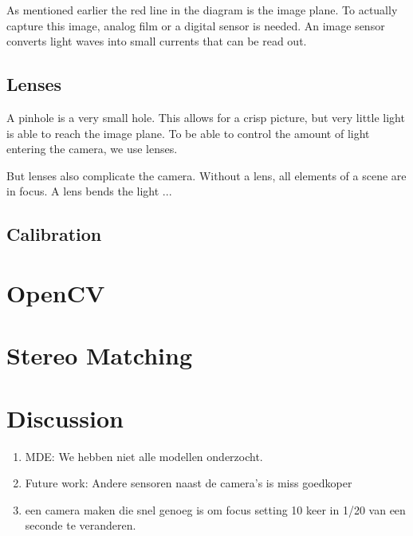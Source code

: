 \documentclass{article}[a4paper]
\begin{document}
As mentioned earlier the red line in the diagram is the image plane.
To actually capture this image, analog film or a digital sensor is needed. An image sensor converts light waves into small currents that can be read out. 

\subsection{Lenses}
A pinhole is a very small hole. This allows for a crisp picture, but very little light is able to reach the image plane. To be able to control the amount of light entering the camera, we use lenses.

But lenses also complicate the camera. Without a lens, all elements of a scene are in focus. A lens bends the light ...


\subsection{Calibration}

\section{OpenCV}

\section{Stereo Matching}

\newpage

\section{Discussion}
\begin{enumerate}
    \item MDE: We hebben niet alle modellen onderzocht.
    \item Future work: Andere sensoren naast de camera's is miss goedkoper
    \item een camera maken die snel genoeg is om focus setting 10 keer in 1/20 van een seconde te veranderen.
\end{enumerate}




\newpage


\end{document}
